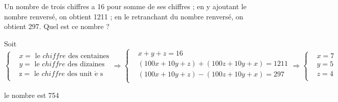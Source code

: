 \begin{solution}
Un nombre de trois chiffres a 16 pour somme de ses chiffres ; en y ajoutant le nombre renversé, on obtient 1211 ; en le retranchant du nombre renversé, on obtient 297. Quel est ce nombre ?

Soit $\left\{ \begin{array}{ll}
  & x=\text{ le }chiffre\text{ des centaines} \\ 
 & y=\text{ le }chiffre\text{ des dizaines} \\ 
 & \text{z}=\text{ le }chiffre\text{ des unit }\!\!\acute{\mathrm{e}}\!\!\text{ s} \\ 
\end{array} \right.\Rightarrow \left\{ \begin{array}{ll}
  & x+y+z=16 \\ 
 & \left( 100x+10y+z \right)+\left( 100z+10y+x \right)=1211 \\ 
 & \left( 100x+10y+z \right)-\left( 100z+10y+x \right)=297 \\ 
\end{array} \right.\Rightarrow \left\{ \begin{array}{ll}
  & x=7 \\ 
 & y=5 \\ 
 & z=4 \\ 
\end{array} \right.$	


le nombre est 754
\end{solution}
